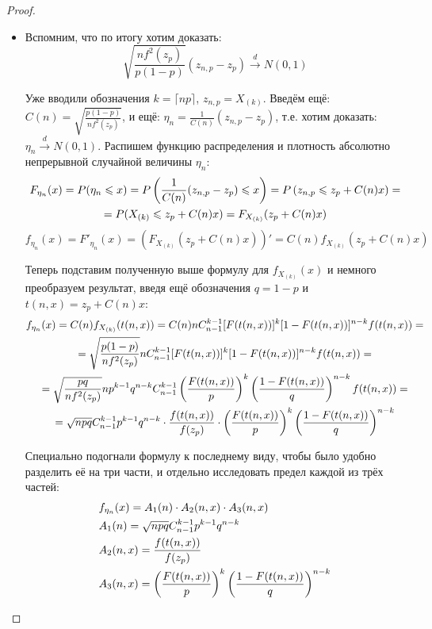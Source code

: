 \begin{proof}
\begin{itemize}
        \item Вспомним, что по итогу хотим доказать:
        \[
            \sqrt{\frac{n f^2(z_p)}{p(1-p)}}(z_{n,p} - z_p) \xrightarrow{d} N(0, 1)
        \]

        Уже вводили обозначения $k = \lceil np \rceil$, $z_{n, p} = X_{(k)}$. Введём ещё: $C(n) = \sqrt{\frac{p(1-p)}{n f^2(z_p)}}$, и ещё: $\eta_n = \frac{1}{C(n)} (z_{n,p} - z_p)$, т.е. хотим доказать: $\eta_n \xrightarrow{d} N(0, 1)$. Распишем функцию распределения и плотность абсолютно непрерывной случайной величины $\eta_n$:
        \begin{multline*}
            F_{\eta_n}(x) = P(\eta_n \leqslant x) = P\left(\frac{1}{C(n)} (z_{n,p} - z_p) \leqslant x\right) = P\left(z_{n,p} \leqslant z_p + C(n)x\right) =
            \\
            = P(X_{(k)} \leqslant z_p + C(n)x) = F_{X_{(k)}}(z_p + C(n)x)
        \end{multline*}
        \[
            f_{\eta_n}(x) = F'_{\eta_n}(x) = (F_{X_{(k)}}(z_p + C(n)x))' = C(n) f_{X_{(k)}}(z_p + C(n)x)
        \]

        Теперь подставим полученную выше формулу для $f_{X_{(k)}}(x)$ и немного преобразуем результат, введя ещё обозначения $q = 1-p$ и $t(n, x) = z_p + C(n)x$:
        \begin{multline*}
            f_{\eta_n}(x) = C(n) f_{X_{(k)}}(t(n, x)) = C(n) n C_{n-1}^{k-1} [F(t(n, x))]^k [1-F(t(n, x))]^{n-k} f(t(n, x)) =
            \\
            = \sqrt{\frac{p(1-p)}{n f^2(z_p)}} n C_{n-1}^{k-1} [F(t(n, x))]^k [1-F(t(n, x))]^{n-k} f(t(n, x)) =
            \\
            = \sqrt{\frac{pq}{n f^2(z_p)}} n p^{k-1} q^{n-k} C_{n-1}^{k-1} \left(\frac{F(t(n, x))}{p}\right)^k \left(\frac{1-F(t(n, x))}{q}\right)^{n-k} f(t(n, x)) =
            \\
            = \sqrt{npq} C_{n-1}^{k-1} p^{k-1} q^{n-k} \cdot \frac{f(t(n, x))}{f(z_p)} \cdot \left(\frac{F(t(n, x))}{p}\right)^k \left(\frac{1-F(t(n, x))}{q}\right)^{n-k}
        \end{multline*}

        Специально подогнали формулу к последнему виду, чтобы было удобно разделить её на три части, и отдельно исследовать предел каждой из трёх частей:
        \begin{align*}
            & f_{\eta_n}(x) = A_1(n) \cdot A_2(n, x) \cdot A_3(n, x)
            \\
            & A_1(n) = \sqrt{npq} C_{n-1}^{k-1} p^{k-1} q^{n-k}
            \\
            & A_2(n, x) = \frac{f(t(n, x))}{f(z_p)}
            \\
            & A_3(n, x) = \left(\frac{F(t(n, x))}{p}\right)^k \left(\frac{1-F(t(n, x))}{q}\right)^{n-k}
        \end{align*}


\end{itemize}
\end{proof}
